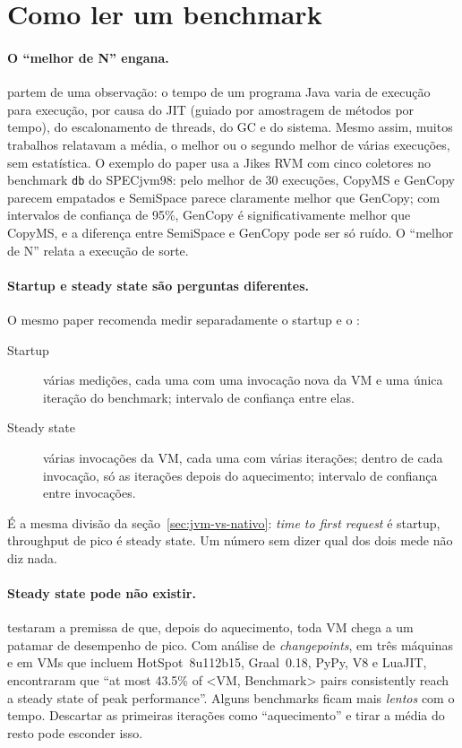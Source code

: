 \section{Como ler um benchmark}
\label{sec:como-ler-benchmark}

\paragraph{O \enquote{melhor de N} engana.}
\textcite{paper:statistically-rigorous-java-perf} partem de uma
observação: o tempo de um programa Java varia de execução para execução,
por causa do JIT (guiado por amostragem de métodos por tempo), do
escalonamento de threads, do GC e do sistema. Mesmo assim, muitos
trabalhos relatavam a média, o melhor ou o segundo melhor de várias
execuções, sem estatística. O exemplo do paper usa a Jikes RVM com cinco
coletores no benchmark \texttt{db} do SPECjvm98: pelo melhor de 30
execuções, CopyMS e GenCopy parecem empatados e SemiSpace parece
claramente melhor que GenCopy; com intervalos de confiança de 95\%,
GenCopy é significativamente melhor que CopyMS, e a diferença entre
SemiSpace e GenCopy pode ser só ruído. O \enquote{melhor de N} relata a execução de
sorte.

\paragraph{Startup e steady state são perguntas diferentes.}
O mesmo paper recomenda medir separadamente o startup e o
:
\begin{description}
\item[Startup] várias medições, cada uma com uma invocação nova da VM e
  uma única iteração do benchmark; intervalo de confiança entre elas.
\item[Steady state] várias invocações da VM, cada uma com várias
  iterações; dentro de cada invocação, só as iterações depois do
  aquecimento; intervalo de confiança entre invocações.
\end{description}
É a mesma divisão da seção~\ref{sec:jvm-vs-nativo}: \emph{time to first
request} é startup, throughput de pico é steady state. Um número sem
dizer qual dos dois mede não diz nada.

\paragraph{Steady state pode não existir.}
\textcite{paper:vm-warmup-hot-cold} testaram a premissa de que, depois do
aquecimento, toda VM chega a um patamar de desempenho de pico. Com
análise de \emph{changepoints}, em três máquinas e em VMs que incluem
HotSpot~8u112b15, Graal~0.18, PyPy, V8 e LuaJIT, encontraram que
\enquote{at most 43.5\% of <VM, Benchmark> pairs consistently reach a
steady state of peak performance}. Alguns benchmarks ficam mais
\emph{lentos} com o tempo. Descartar as primeiras iterações como
\enquote{aquecimento} e tirar a média do resto pode esconder isso.

